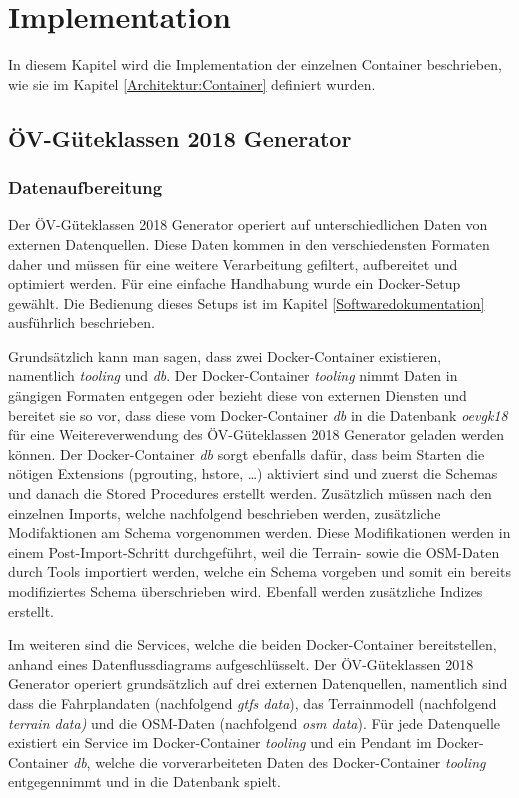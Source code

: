 
\section{Implementation}
\label{Implementation}

In diesem Kapitel wird die Implementation der einzelnen Container beschrieben, wie sie im Kapitel \ref{Architektur:Container} definiert wurden.

\subsection{ÖV-Güteklassen 2018 Generator}
\label{Implementation:ÖV-Güteklassen 2018 Generator}

\subsubsection{Datenaufbereitung}
\label{ÖV-Güteklassen 2018 Generator:Datenaufbereitung}

Der \acs{ÖV}-Güteklassen 2018 Generator operiert auf unterschiedlichen Daten von externen Datenquellen.
Diese Daten kommen in den verschiedensten Formaten daher und müssen für eine weitere Verarbeitung gefiltert, aufbereitet und optimiert werden.
Für eine einfache Handhabung wurde ein Docker-Setup gewählt.
Die Bedienung dieses Setups ist im Kapitel \ref{Softwaredokumentation} ausführlich beschrieben.

Grundsätzlich kann man sagen, dass zwei Docker-Container existieren, namentlich \emph{tooling} und \emph{db}.
Der Docker-Container \emph{tooling} nimmt Daten in gängigen Formaten entgegen oder bezieht diese von externen Diensten und bereitet sie so vor, dass diese vom Docker-Container \emph{db} in die Datenbank \emph{oevgk18} für eine Weitereverwendung des \acs{ÖV}-Güteklassen 2018 Generator geladen werden können.
Der Docker-Container \emph{db} sorgt ebenfalls dafür, dass beim Starten die nötigen Extensions (pgrouting, hstore, \dots) aktiviert sind und zuerst die Schemas und danach die Stored Procedures erstellt werden.
Zusätzlich müssen nach den einzelnen Imports, welche nachfolgend beschrieben werden, zusätzliche Modifaktionen am Schema vorgenommen werden.
Diese Modifikationen werden in einem Post-Import-Schritt durchgeführt, weil die Terrain- sowie die OSM-Daten durch Tools importiert werden, welche ein Schema vorgeben und somit ein bereits modifiziertes Schema überschrieben wird. Ebenfall werden zusätzliche Indizes erstellt.

Im weiteren sind die Services, welche die beiden Docker-Container bereitstellen, anhand eines Datenflussdiagrams aufgeschlüsselt.
Der \acs{ÖV}-Güteklassen 2018 Generator operiert grundsätzlich auf drei externen Datenquellen, namentlich sind dass die Fahrplandaten (nachfolgend \emph{gtfs data}), das Terrainmodell (nachfolgend \emph{terrain data)} und die \acs{OSM}-Daten (nachfolgend \emph{osm data}).
Für jede Datenquelle existiert ein Service im Docker-Container \emph{tooling} und ein Pendant im Docker-Container \emph{db}, welche die vorverarbeiteten Daten des Docker-Container \emph{tooling} entgegennimmt und in die Datenbank spielt.

